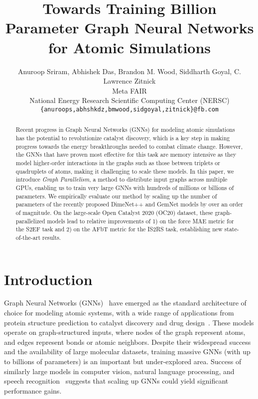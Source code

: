 \documentclass{article} \usepackage{iclr2022_conference,times}
\title{Towards Training Billion Parameter Graph Neural Networks for Atomic Simulations}
\author{Anuroop Sriram, Abhishek Das, Brandon M. Wood, Siddharth Goyal, C. Lawrence Zitnick \\
Meta FAIR \\
National Energy Research Scientific Computing Center (NERSC) \\
\texttt{\{anuroops,abhshkdz,bmwood,sidgoyal,zitnick\}@fb.com} \\
}
\begin{document}
\maketitle

\begin{abstract}

Recent progress in Graph Neural Networks (GNNs) for modeling atomic simulations
has the potential to revolutionize catalyst discovery, which is a key step in
making progress towards the energy breakthroughs needed to combat climate change.
However, the GNNs that have proven most effective for this task are memory
intensive as they model higher-order interactions in the graphs such as those
between triplets or quadruplets of atoms, making it challenging to scale these models.
In this paper, we introduce \emph{Graph Parallelism}, a method to distribute input
graphs across multiple GPUs, enabling us to train very large GNNs with hundreds
of millions or billions of parameters. We empirically evaluate our method by
scaling up the number of parameters of the recently proposed DimeNet++ and
GemNet models by over an order of magnitude. On the large-scale Open Catalyst 2020 (OC20) dataset,
these graph-parallelized models lead to relative improvements of 1)  on
the force MAE metric for the S2EF task and 2)  on the AFbT metric for the
IS2RS task, establishing new state-of-the-art results.

\end{abstract}

\section{Introduction}
\label{sec:intro}

Graph Neural Networks (GNNs)~\citep{gori2005new,zhou2020graph} have emerged
as the standard architecture of choice for modeling atomic systems, with
a wide range of applications from protein structure prediction to catalyst discovery and drug design~\citep{schutt2017quantum,gilmer2017neural,jorgensen2018neural,zitnick2020introduction,schutt2017schnet,xie2018crystal}.
These models operate on graph-structured inputs, where nodes of the graph
represent atoms, and edges represent bonds or atomic neighbors. Despite their
widespread success and the availability of large molecular datasets, training massive GNNs (with up to billions of
parameters) is an important but under-explored area. Success of
similarly large models in computer vision, natural language processing, and speech
recognition~\citep{shoeybi2020megatronlm,huang2019gpipe,brown2020language,zhai2021scaling}
suggests that scaling up GNNs could yield significant performance gains.
\end{document}
